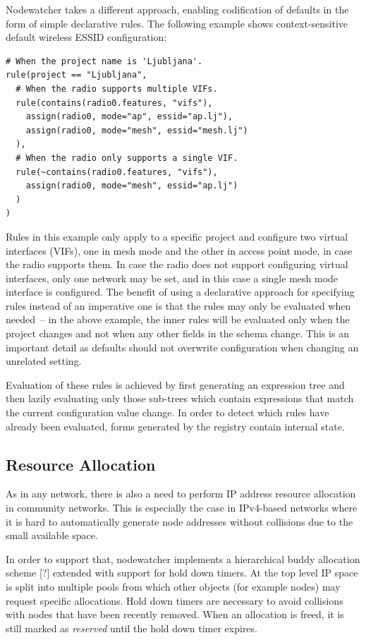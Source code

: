 \documentclass[5p,sort&compress]{elsarticle}
\begin{document}
Nodewatcher takes a different approach, enabling codification of defaults in the form of simple declarative rules. The following example shows context-sensitive default wireless ESSID configuration:
\begin{verbatim}
# When the project name is 'Ljubljana'.
rule(project == "Ljubljana",
  # When the radio supports multiple VIFs.
  rule(contains(radio0.features, "vifs"),
    assign(radio0, mode="ap", essid="ap.lj"),
    assign(radio0, mode="mesh", essid="mesh.lj")
  ),
  # When the radio only supports a single VIF.
  rule(~contains(radio0.features, "vifs"),
    assign(radio0, mode="mesh", essid="ap.lj")
  )
)
\end{verbatim}

Rules in this example only apply to a specific project and configure two virtual interfaces (VIFs), one in mesh mode and the other in access point mode, in case the radio supports them.
In case the radio does not support configuring virtual interfaces, only one network may be set, and in this case a single mesh mode interface is configured.
The benefit of using a declarative approach for specifying rules instead of an imperative one is that the rules may only be evaluated when needed~-- in the above example, the inner rules will be evaluated only when the project changes and not when any other fields in the schema change.
This is an important detail as defaults should not overwrite configuration when changing an unrelated setting.

Evaluation of these rules is achieved by first generating an expression tree and then lazily evaluating only those sub-trees which contain expressions that match the current configuration value change.
In order to detect which rules have already been evaluated, forms generated by the registry contain internal state.

\subsection{Resource Allocation}

As in any network, there is also a need to perform IP address resource allocation in community networks.
This is especially the case in IPv4-based networks where it is hard to automatically generate node addresses without collisions due to the small available space.

In order to support that, nodewatcher implements a hierarchical buddy allocation scheme [?] extended with support for hold down timers.
At the top level IP space is split into multiple pools from which other objects (for example nodes) may request specific allocations.
Hold down timers are necessary to avoid collisions with nodes that have been recently removed.
When an allocation is freed, it is still marked as \textit{reserved} until the hold down timer expires.
\end{document}
